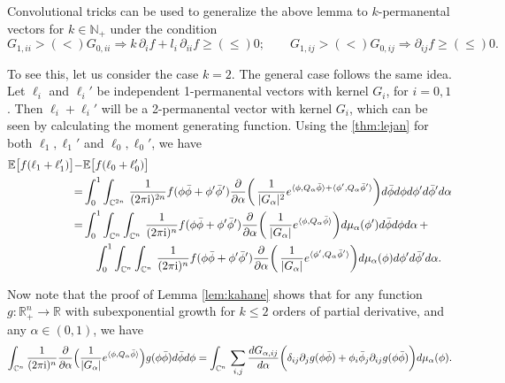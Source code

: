 \documentclass[a4paper, 11pt]{article}
\newcommand{\E}{\mathbb{E}}
\newcommand{\compi}{\textnormal{i}}
\begin{document}
Convolutional tricks can be used to generalize the above lemma to $k$-permanental vectors for $k\in\mathbb{N}_+$ under the condition
\[G_{1,ii}>(<)G_{0,ii} \Rightarrow k\,\partial_i f+l_i\,\partial_{ii}f\geq(\leq)0; \qquad G_{1,ij}>(<)G_{0,ij} \Rightarrow \partial_{ij}f\geq(\leq)0.\]

To see this, let us consider the case $k=2$. The general case follows the same idea. Let $\ell_i$ and $\ell_i'$ be independent 1-permanental vectors with kernel $G_i$, for $i=0,1$. Then $\ell_i+\ell_i'$ will be a 2-permanental vector with kernel $G_i$, which can be seen by calculating the moment generating function. Using the \cref{thm:lejan} for both $\ell_1,\ell_1'$ and $\ell_0,\ell_0'$, we have
\begin{equation*}
\begin{aligned}
\E\big[f( \ell_1 +\ell_1')\big]-& \E\big[f(\ell_0+\ell_0')\big]\\
=&\int_0^1\int_{\mathbb{C}^{2n}}\,
\frac{1}{(2\pi \compi)^{2n}}f(\phi\bar{\phi}+\phi'\bar{\phi}') \frac{\partial}{\partial \alpha}\bigg(\, \frac{1}{|G_\alpha|^2}e^{\langle \phi,Q_{\alpha}\bar{\phi} \rangle+\langle \phi',Q_{\alpha}\bar{\phi}' \rangle}\bigg)
d\bar{\phi} d\phi d\phi'd\bar{\phi}'d\alpha\\
=&\int_0^1\int_{\mathbb{C}^n}\int_{\mathbb{C}^n}\,
\frac{1}{(2\pi \compi)^n}f(\phi\bar{\phi}+\phi'\bar{\phi}') \frac{\partial}{\partial \alpha}\bigg(\, \frac{1}{|G_\alpha|}e^{\langle \phi,Q_{\alpha}\bar{\phi} \rangle} \bigg)d\mu_\alpha(\phi')
d\bar{\phi} d\phi d\alpha \,+ \\
&\hspace{1em}\int_0^1\int_{\mathbb{C}^n}\int_{\mathbb{C}^n}\,
\frac{1}{(2\pi \compi)^n}f(\phi\bar{\phi}+\phi'\bar{\phi}') \frac{\partial}{\partial \alpha}\bigg(\, \frac{1}{|G_\alpha|}e^{\langle \phi',Q_{\alpha}\bar{\phi}' \rangle} \bigg)d\mu_\alpha(\phi)
d\phi' d\bar{\phi}'d\alpha.
\end{aligned}
\end{equation*}

Now note that the proof of Lemma \ref{lem:kahane} shows that for any function $g:\mathbb{R}_+^n\rightarrow\mathbb{R}$ with subexponential growth for $k\leq 2$ orders of partial derivative, and any $\alpha\in(0,1)$, we have
\[\int_{\mathbb{C}^n}\frac{1}{(2\pi\compi)^n}\frac{\partial}{\partial \alpha}\Big(\frac{1}{|G_\alpha|}e^{\langle\phi, Q_\alpha\bar{\phi}\rangle}\Big)g(\phi\bar{\phi}) d\bar{\phi}d\phi = \int_{\mathbb{C}^n}\,
\sum_{i,j}\frac{d G_{\alpha,ij}}{d\alpha}\bigg(  \delta_{ij}\partial_j g(\phi\bar{\phi}) + \phi_i\bar{\phi}_j\partial_{ij} g(\phi\bar{\phi}) \bigg)
d\mu_\alpha(\phi).\]
\end{document}
